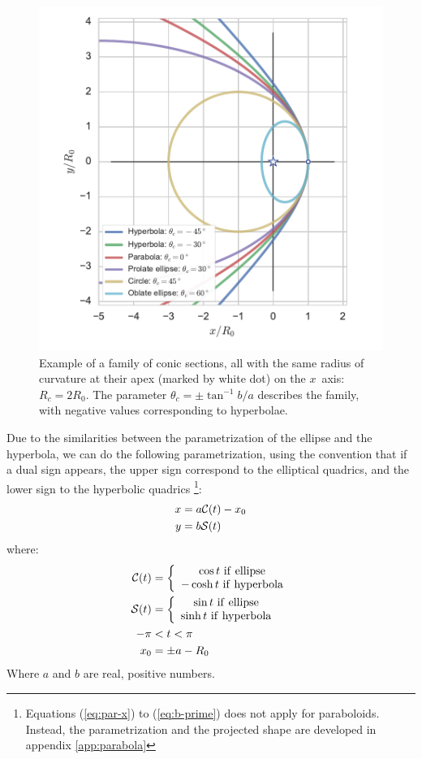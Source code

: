 \begin{figure}
\includegraphics[width=\linewidth]{conic1}
\caption{Example of a family of conic sections, all with the same
  radius of curvature at their apex (marked by white dot) on the
  \(x\)~axis: \(R_c = 2 R_0\). The parameter
  $\theta_c = \pm \tan^{-1} b/a$ describes the family, with negative
  values corresponding to hyperbolae.}
\label{fig:conics-family}
\end{figure}

Due to the similarities between the parametrization of the ellipse and the hyperbola, we can do the following parametrization, using the convention
that if a dual sign appears, the upper sign correspond to the elliptical quadrics, and the lower sign to the hyperbolic quadrics
\footnote{Equations (\ref{eq:par-x}) to (\ref{eq:b-prime}) does not apply for paraboloids. Instead, the parametrization and the
  projected shape are developed in appendix \ref{app:parabola}}:
\begin{align}
x &= a\mathcal{C}(t)-x_0 \label{eq:par-x}\\ 
y &= b\mathcal{S}(t) \label{eq:par-y}
\end{align}
where:
\begin{align}
\mathcal{C}(t) &= \left\lbrace \begin{array}{c}
\cos t ~\mathrm{if~ellipse} \\
-\cosh t ~\mathrm{if~hyperbola}
\end{array}\right.\\
\mathcal{S}(t) &= \left\lbrace \begin{array}{c}
\sin t ~\mathrm{if~ellipse} \\
\sinh t ~\mathrm{if~hyperbola}
\end{array}\right. \\
-\pi &< t < \pi \\
x_0 &= \pm a - R_0 \label{eq:x0}\\
\end{align}
Where $a$ and $b$ are real, positive numbers.

